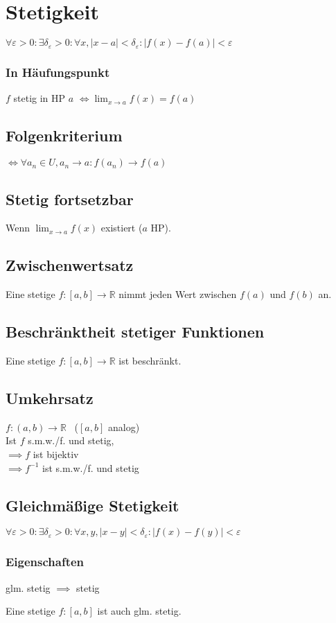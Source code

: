 \section*{Stetigkeit}

$\forall \varepsilon>0: \exists \delta_\varepsilon>0: \forall x, |x-a|<\delta_\varepsilon: |f(x)-f(a)|<\varepsilon$

\subsubsection*{In Häufungspunkt}
$f$ stetig in HP $a$ $\displaystyle \iff \lim_{x\to a}f(x)=f(a)$

\subsection*{Folgenkriterium}
$\iff \forall a_n \in U, a_n\to a: f(a_n)\to f(a)$

\subsection*{Stetig fortsetzbar}
Wenn $\displaystyle \lim_{x\to a}f(x)$ existiert ($a$ HP).

\subsection*{Zwischenwertsatz}
Eine stetige $f: [a,b]\to\mathbb{R}$ nimmt jeden Wert zwischen $f(a)$ und $f(b)$ an.

\subsection*{Beschränktheit stetiger Funktionen}
Eine stetige $f: [a,b]\to\mathbb{R}$ ist beschränkt.

\subsection*{Umkehrsatz}
$f:(a,b)\to\mathbb{R}$ ~($[a,b]$ analog) \\
Ist $f$ s.m.w./f. und stetig, \\
$\implies f$ ist bijektiv \\
$\implies f^{-1}$ ist s.m.w./f. und stetig

\subsection*{Gleichmäßige Stetigkeit}
$\forall \varepsilon>0: \exists \delta_\varepsilon>0: \forall x,y,|x-y|<\delta_\varepsilon:|f(x)-f(y)|<\varepsilon$

\subsubsection*{Eigenschaften}
glm. stetig $\implies$ stetig

Eine stetige $f: [a,b]$ ist auch glm. stetig.
